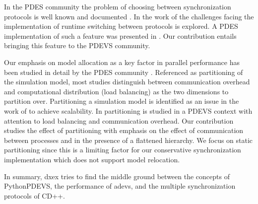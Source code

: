 In the PDES community the problem of choosing between synchronization protocols is well known and documented \cite{Jha:1994:UFC:195291.182480}.
In the work of \cite{Das:1996:APP:256562.256602} the challenges facing the implementation of runtime switching between protocols is explored.
A PDES implementation of such a feature was presented in \cite{perumalla2005musik}. 
Our contribution entails bringing this feature to the PDEVS community.


Our emphasis on model allocation as a key factor in parallel performance has been studied in detail by the PDES community \cite{PDESpartitioning}. 
Referenced as partitioning of the simulation model, most studies distinguish between communication overhead and computational distribution (load balancing) as the two dimensions to partition over.
Partitioning a simulation model is identified as an issue in the work of \cite{Scalability} to achieve scalability. 
In \cite{PDEVSpartitioning} partitioning is studied in a PDEVS context with attention to load balancing and communication overhead.
Our contribution studies the effect of partitioning with emphasis on the effect of communication between processes and in the presence of a flattened hierarchy. 
We focus on static partitioning since this is a limiting factor for our conservative synchronization implementation which does not support model relocation.


In summary, dxex tries to find the middle ground between the concepts of PythonPDEVS, the performance of adevs, and the multiple synchronization protocols of CD++.

